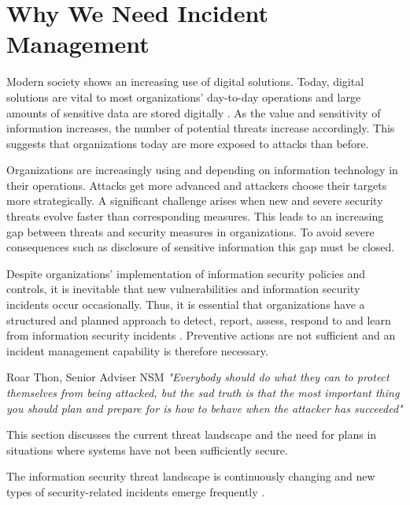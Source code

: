 \section{Why We Need Incident Management}
\label{sec:threatLandscape}
Modern society shows an increasing use of digital solutions. Today, digital solutions are vital to most organizations' day-to-day operations and large amounts of sensitive data are stored digitally \cite{KriposTrender}. As the value and sensitivity of information increases, the number of potential threats increase accordingly. This suggests that organizations today are more exposed to attacks than before. 

Organizations are increasingly using and depending on information technology in their operations. Attacks get more advanced and attackers choose their targets more strategically. A significant challenge arises when new and severe security threats evolve faster than corresponding measures. This leads to an increasing gap between threats and security measures in organizations. To avoid severe consequences such as disclosure of sensitive information this gap must be closed.

Despite organizations' implementation of information security policies and controls, it is inevitable that new vulnerabilities and information security incidents occur occasionally. Thus, it is essential that organizations have a structured and planned approach to detect, report, assess, respond to and learn from information security incidents \cite{ISO/IEC27035}. Preventive actions are not sufficient and an incident management capability is therefore necessary.

\begin{newquote}{Roar Thon, Senior Adviser \acs{NSM}}
\textit{"Everybody should do what they can to protect themselves from being attacked, but the sad truth is that the most important thing you should plan and prepare for is how to behave when the attacker has succeeded"}
\end{newquote}

This section discusses the current threat landscape and the need for plans in situations where systems have not been sufficiently secure. 

The information security threat landscape is continuously changing and new types of security-related incidents emerge frequently \cite{nist800-61}. %


